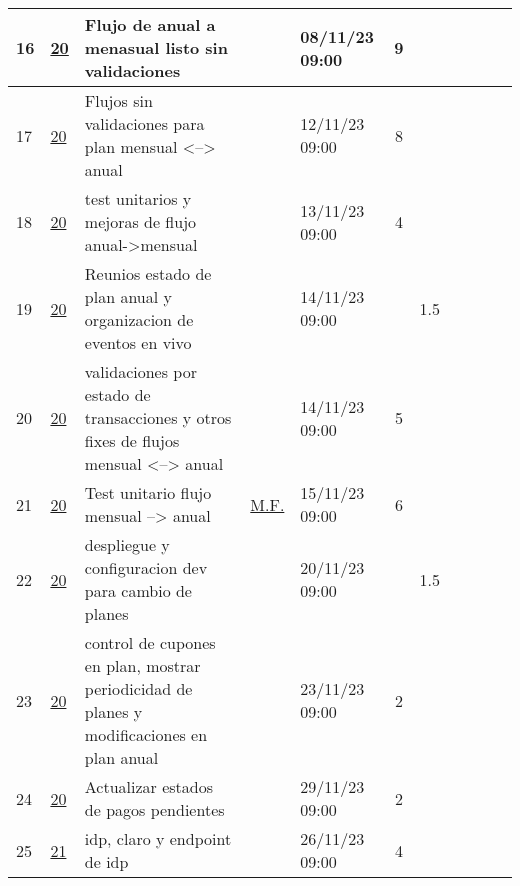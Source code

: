 \documentclass{article}
\begin{document}
\begin{longtable}{|m{0.5cm}|m{1.2cm}|p{5cm}|m{1.5cm}|m{1.5cm}||c|c|c|c|c|c|    |}
                 \label{16}16  &  \hyperref[20]{\color{blue}20}  & Flujo de anual a menasual listo sin validaciones &  
                 & 08/11/23 09:00  & 9 &  &  &  &  & \\ \hline 

                 \label{17}17  &  \hyperref[20]{\color{blue}20}  & Flujos sin validaciones para plan mensual <--> anual &  
                 & 12/11/23 09:00  & 8 &  &  &  &  & \\ \hline 

                 \label{18}18  &  \hyperref[20]{\color{blue}20}  & test unitarios y mejoras de flujo anual->mensual &  
                 & 13/11/23 09:00  & 4 &  &  &  &  & \\ \hline 

                 \label{19}19  &  \hyperref[20]{\color{blue}20}  & Reunios estado de plan anual y organizacion de eventos en vivo &  
                 & 14/11/23 09:00  &  & 1.5 &  &  &  & \\ \hline 

                 \label{20}20  &  \hyperref[20]{\color{blue}20}  & validaciones por estado de transacciones y otros fixes de flujos mensual <--> anual &  
                 & 14/11/23 09:00  & 5 &  &  &  &  & \\ \hline 

                 \label{21}21  &  \hyperref[20]{\color{blue}20}  & Test unitario flujo mensual --> anual &  
                  \hyperref[M.F.]{\color{blue}M.F.}  & 15/11/23 09:00  & 6 &  &  &  &  & \\ \hline 

                 \label{22}22  &  \hyperref[20]{\color{blue}20}  & despliegue y configuracion dev para cambio de planes &  
                 & 20/11/23 09:00  &  & 1.5 &  &  &  & \\ \hline 

                 \label{23}23  &  \hyperref[20]{\color{blue}20}  & control de cupones en plan, mostrar periodicidad de planes y modificaciones en plan anual &  
                 & 23/11/23 09:00  & 2 &  &  &  &  & \\ \hline 

                 \label{24}24  &  \hyperref[20]{\color{blue}20}  & Actualizar estados de pagos pendientes &  
                 & 29/11/23 09:00  & 2 &  &  &  &  & \\ \hline 

                 \label{25}25  &  \hyperref[21]{\color{blue}21}  & idp, claro y endpoint de idp &  
                 & 26/11/23 09:00  & 4 &  &  &  &  & \\ \hline 


\end{longtable}
\end{document}
